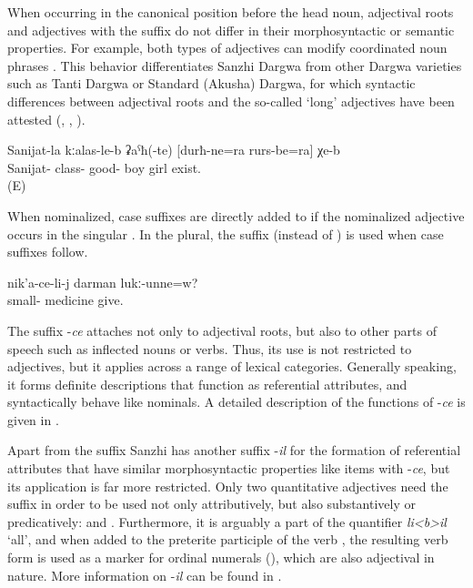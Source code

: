 When occurring in the canonical position before the head noun, adjectival roots and adjectives with the suffix  do not differ in their morphosyntactic or semantic properties. For example, both types of adjectives can modify coordinated noun phrases . This behavior differentiates Sanzhi Dargwa from other Dargwa varieties such as Tanti Dargwa or Standard (Akusha) Dargwa, for which syntactic differences between adjectival roots and the so-called `long' adjectives have been attested (\citealp[26]{vandenBerg2001}, \citealp[207]{Abdullaev2014}, \citealp{Lander2014}).
%
\begin{exe}
	\ex	\label{ex:In Sanijats class there are good}
	\gll	Sanijat-la	kːalas-le-b	ʡaˁħ(-te)	[durħ-ne=ra	rurs-be=ra]	χe-b\\
		Sanijat-	class-	good- 	boy\tsc{-pl=add}	girl	exist. \\
	‎\glt	‎‎ (E)
\end{exe}

When nominalized, case suffixes are directly added to  if the nominalized adjective occurs in the singular . In the plural, the suffix  (instead of ) is used when case suffixes follow.
%
\begin{exe}
	\ex	\label{ex:Does he give medicine to the little one}
	\gll	nik'a-ce-li-j	darman	lukː-unne=w? \\
		small-	medicine	give. \\
	\glt	{}
\end{exe}


The suffix -\textit{ce} attaches not only to adjectival roots, but also to other parts of speech such as inflected nouns or verbs. Thus, its use is not restricted to adjectives, but it applies across a range of lexical categories. Generally speaking, it forms definite descriptions that function as referential attributes, and syntactically behave like nominals. A detailed description of the functions of -\textit{ce} is given in .

Apart from the suffix  Sanzhi has another suffix -\textit{il} for the formation of referential attributes that have similar morphosyntactic properties like items with -\textit{ce}, but its application is far more restricted. Only two quantitative adjectives need the suffix  in order to be used not only attributively, but also substantively or predicatively:   and  . Furthermore, it is arguably a part of the quantifier \textit{li<b>il} `all', and when added to the preterite participle of the verb  , the resulting verb form is used as a marker for ordinal numerals (), which are also adjectival in nature. More information on -\textit{il} can be found in .




